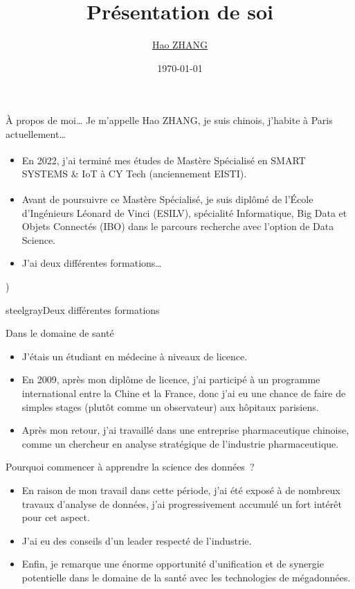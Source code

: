 \documentclass{beamer}
\title{Présentation de soi}
\author{\href{mailto:haozhang@me.com}{Hao ZHANG}}
\date{\today}
\begin{document}
	\maketitle
	
	
	\begin{frame}{À propos de moi…}
		Je m'appelle Hao ZHANG,  je suis chinois, j'habite à Paris actuellement…
		\begin{itemize}
			\item En 2022, j'ai terminé mes études de Mastère Spécialisé\textsuperscript{\textregistered} en SMART SYSTEMS \& IoT à CY Tech (anciennement EISTI).
			\item Avant de poursuivre ce Mastère Spécialisé\textsuperscript{\textregistered}, je suis diplômé de l'École d'Ingénieurs Léonard de Vinci (ESILV), spécialité Informatique, Big Data et Objets Connectés (IBO) dans le parcours recherche avec l'option de Data Science.
			\item J'ai deux différentes formations…
		\end{itemize}
	\end{frame}\right) 
	
	\begin{chapter}{steelgray}{Deux différentes formations}
	\end{chapter}
	
	\begin{frame}[fragile]{Dans le domaine de santé}
		\begin{itemize}[<+->]
			\item J'étais un étudiant en médecine à niveaux de licence.
			\item En 2009, après mon diplôme de licence, j'ai participé à un programme international entre la Chine et la France, donc j'ai eu une chance de faire de simples stages (plutôt comme un observateur) aux hôpitaux parisiens.
			\item Après mon retour, j'ai travaillé dans une entreprise pharmaceutique chinoise, comme un chercheur en analyse stratégique de l'industrie pharmaceutique.
		\end{itemize}
	\end{frame}
	
	\begin{frame}[fragile]{Pourquoi commencer à apprendre la science des données ?}
		\begin{itemize}[<+->]
			\item En raison de mon travail dans cette période, j'ai été exposé à de nombreux travaux d'analyse de données, j'ai progressivement accumulé un fort intérêt pour cet aspect.
			\item J'ai eu des conseils d'un leader respecté de l'industrie.
			\item Enfin, je remarque une énorme opportunité d'unification et de synergie potentielle dans le domaine de la santé avec les technologies de mégadonnées.
		\end{itemize}
	\end{frame}
	
\end{document}

